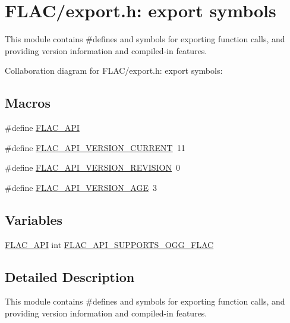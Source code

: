 \hypertarget{group__flac__export}{}\section{F\+L\+A\+C/export.h\+: export symbols}
\label{group__flac__export}


This module contains \#defines and symbols for exporting function calls, and providing version information and compiled-\/in features.  


Collaboration diagram for F\+L\+A\+C/export.h\+: export symbols\+:
\subsection*{Macros}
\begin{DoxyCompactItemize}
\item 
\#define \hyperlink{group__flac__export_ga56ca07df8a23310707732b1c0007d6f5}{F\+L\+A\+C\+\_\+\+A\+PI}
\item 
\#define \hyperlink{group__flac__export_ga31180fe15eea416cd8957cfca1a4c4f8}{F\+L\+A\+C\+\_\+\+A\+P\+I\+\_\+\+V\+E\+R\+S\+I\+O\+N\+\_\+\+C\+U\+R\+R\+E\+NT}~11
\item 
\#define \hyperlink{group__flac__export_ga811641dd9f8c542d9260240e7fbe8e93}{F\+L\+A\+C\+\_\+\+A\+P\+I\+\_\+\+V\+E\+R\+S\+I\+O\+N\+\_\+\+R\+E\+V\+I\+S\+I\+ON}~0
\item 
\#define \hyperlink{group__flac__export_ga1add3e09c8dfd57e8c921f299f0bbec1}{F\+L\+A\+C\+\_\+\+A\+P\+I\+\_\+\+V\+E\+R\+S\+I\+O\+N\+\_\+\+A\+GE}~3
\end{DoxyCompactItemize}
\subsection*{Variables}
\begin{DoxyCompactItemize}
\item 
\hyperlink{group__flac__export_ga56ca07df8a23310707732b1c0007d6f5}{F\+L\+A\+C\+\_\+\+A\+PI} int \hyperlink{group__flac__export_gaf762876dd61fbf2da1bef49762900533}{F\+L\+A\+C\+\_\+\+A\+P\+I\+\_\+\+S\+U\+P\+P\+O\+R\+T\+S\+\_\+\+O\+G\+G\+\_\+\+F\+L\+AC}
\end{DoxyCompactItemize}


\subsection{Detailed Description}
This module contains \#defines and symbols for exporting function calls, and providing version information and compiled-\/in features. 

